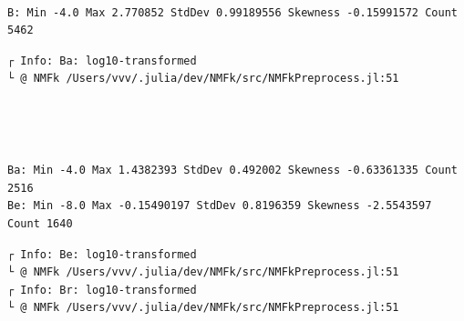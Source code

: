 \documentclass[11pt]{article}
\begin{document}
    \begin{center}
    \end{center}
    { \hspace*{\fill} \\}

    \begin{Verbatim}[commandchars=\\\{\}]
B: Min -4.0 Max 2.770852 StdDev 0.99189556 Skewness -0.15991572 Count 5462
    \end{Verbatim}

    \begin{Verbatim}[commandchars=\\\{\}]
┌ Info: Ba: log10-transformed
└ @ NMFk /Users/vvv/.julia/dev/NMFk/src/NMFkPreprocess.jl:51
    \end{Verbatim}

    \begin{center}
    \end{center}
    { \hspace*{\fill} \\}

    \begin{center}
    \end{center}
    { \hspace*{\fill} \\}

    \begin{Verbatim}[commandchars=\\\{\}]
Ba: Min -4.0 Max 1.4382393 StdDev 0.492002 Skewness -0.63361335 Count 2516
Be: Min -8.0 Max -0.15490197 StdDev 0.8196359 Skewness -2.5543597 Count 1640
    \end{Verbatim}

    \begin{Verbatim}[commandchars=\\\{\}]
┌ Info: Be: log10-transformed
└ @ NMFk /Users/vvv/.julia/dev/NMFk/src/NMFkPreprocess.jl:51
┌ Info: Br: log10-transformed
└ @ NMFk /Users/vvv/.julia/dev/NMFk/src/NMFkPreprocess.jl:51
    \end{Verbatim}

    \begin{center}
    \end{center}
    { \hspace*{\fill} \\}
\end{document}
